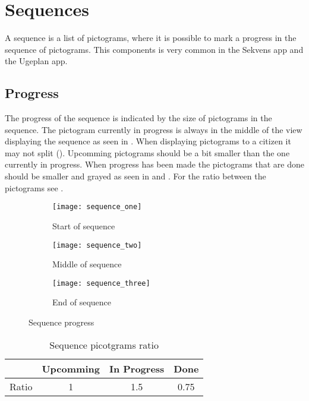 
\chapter{Sequences}
\label{cha:sequences}

A sequence is a list of pictograms, where it is possible to mark a progress in the sequence of pictograms. This components is very common in the Sekvens app and the Ugeplan app.

\section{Progress}
\label{sec:progress}

The progress of the sequence is indicated by the size of pictograms in the sequence. The pictogram currently in progress is always in the middle of the view displaying the sequence as seen in . When displaying pictograms to a citizen it may not split (). Upcomming pictograms should be a bit smaller than the one currently in progress. When progress has been made the pictograms that are done should be smaller and grayed as seen in  and . For the ratio between the pictograms see .

\begin{figure}[!htbp]
    \centering

    \begin{subfigure}[t]{0.27\textwidth}
    	\centering
        \texttt{[image: sequence\_one]}
        \caption{Start of sequence}
        \label{fig:sequence_one}
    \end{subfigure}
    \hspace{2em} 
    \begin{subfigure}[t]{0.27\textwidth}
    	\centering
        \texttt{[image: sequence\_two]}
        \caption{Middle of sequence}
        \label{fig:sequence_two}
    \end{subfigure}
    \hspace{2em} 
    \begin{subfigure}[t]{0.27\textwidth}
    	\centering
        \texttt{[image: sequence\_three]}
        \caption{End of sequence}
        \label{fig:sequence_three}
    \end{subfigure}
    
    \caption{Sequence progress}
    \label{fig:sequence_progress}
\end{figure}

\begin{table}[!htbp]
	\centering
	\begin{tabular}{|l|c|c|c|}
		\hline
		~ & Upcomming & In Progress & Done \\ \hline
		Ratio & 1 & 1.5 & 0.75 \\ \hline
	\end{tabular}
	\caption{Sequence picotgrams ratio}
    \label{tab:sequence_ratio}
\end{table}
